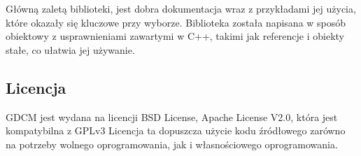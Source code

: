 \par
Główną zaletą biblioteki, jest dobra dokumentacja wraz z przykładami jej użycia, które okazały się kluczowe przy wyborze.
Biblioteka została napisana w sposób obiektowy z usprawnieniami zawartymi w C++, takimi jak referencje i obiekty stałe, co ułatwia jej używanie.

\subsection{Licencja}

\par 
GDCM jest wydana na licencji BSD License, Apache License V2.0, która jest kompatybilna z GPLv3
Licencja ta dopuszcza użycie kodu źródłowego zarówno na potrzeby wolnego oprogramowania, jak i własnościowego oprogramowania.
